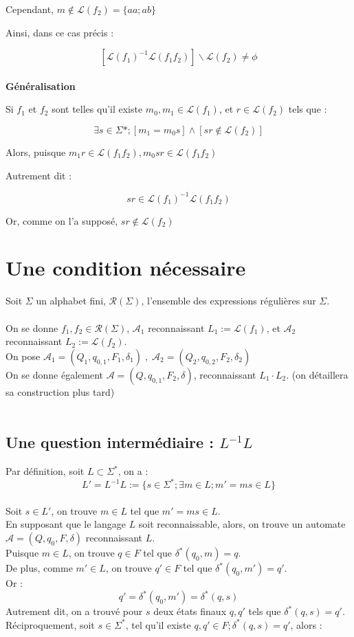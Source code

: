 \documentclass{article}
\begin{document}
Cependant, $m \notin \mathcal{L}(f_2) = \{aa ; ab \}$


Ainsi, dans ce cas précis :

$$[\mathcal{L}(f_1)^{-1}\mathcal{L}(f_1f_2)]\backslash \mathcal{L}(f_2) \neq \phi$$
\\

\textbf{Généralisation}

Si $f_1$ et $f_2$ sont telles qu'il existe $m_0 , m_1 \in \mathcal{L}(f_1)$, et $r \in \mathcal{L}(f_2)$ tels que :

$$\exists s \in \Sigma* ; [m_1 = m_0s] \wedge [sr \notin \mathcal{L}(f_2)]$$

Alors, puisque $m_1r \in \mathcal{L}(f_1f_2), m_0sr \in \mathcal{L}(f_1f_2)$

Autrement dit :

$$sr \in \mathcal{L}(f_1)^{-1}\mathcal{L}(f_1f_2)$$

Or, comme on l'a supposé, $sr \notin \mathcal{L}(f_2)$
\\

\newpage

\section{Une condition nécessaire}

Soit $\Sigma$ un alphabet fini, $\mathcal{R}(\Sigma)$, l'ensemble des expressions régulières sur $\Sigma$.
\\
\\
On se donne $f_1,f_2 \in \mathcal{R}(\Sigma)$, $\mathcal{A}_1$ reconnaissant $L_1 := \mathcal{L}(f_1)$, et $\mathcal{A}_2$ reconnaissant $L_2 := \mathcal{L}(f_2)$.
\\
On pose $\mathcal{A}_1 = (Q_1, q_{0,1},F_1,\delta_1) \; , \; \mathcal{A}_2 = (Q_2, q_{0,2},F_2,\delta_2)$
\\
On se donne également $\mathcal{A} = (Q, q_{0,1}, F_2, \delta)$, reconnaissant $L_1 \cdot L_2$. (on détaillera sa construction plus tard)
\\
\\
\subsection{Une question intermédiaire : $L^{-1}L$}

Par définition, soit $L \subset \Sigma^*$, on a :
$$L' = L^{-1}L := \{s \in \Sigma^* ; \exists m \in L ; m' = ms \in L\}$$
\\
Soit $s \in L'$, on trouve $m \in L$ tel que $m' = ms \in L$.
\\
En supposant que le langage $L$ soit reconnaissable, alors, on trouve un automate $\mathcal{A} = (Q,q_0,F,\delta)$ reconnaissant $L$.
\\
Puisque $m \in L$, on trouve $q \in F$ tel que $\delta^*(q_0, m) = q$.
\\
De plus, comme $m' \in L$, on trouve $q' \in F$ tel que $\delta^*(q_0,m')=q'$.
\\
Or :
$$q' = \delta^*(q_0,m') = \delta^*(q,s)$$
Autrement dit, on a trouvé pour $s$ deux états finaux $q,q'$ tels que $\delta^*(q,s)=q'$.
\\
Réciproquement, soit $s \in \Sigma^*$, tel qu'il existe $q,q' \in F; \delta^*(q,s)=q'$, alors :
\end{document}
